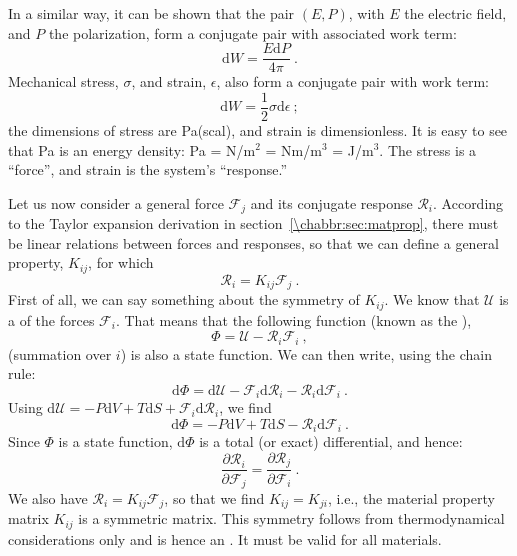 In a similar way, it can be shown that the pair $(E,P)$, with $E$ the electric field, and $P$ the polarization, form a  conjugate pair with associated work term:
\begin{equation}
	\mathrm{d}W = \frac{E\mathrm{d}P}{4\pi}\ .
\end{equation}
Mechanical stress, $\sigma$, and strain, $\epsilon$, also form a conjugate pair with work term:
\begin{equation}
	\mathrm{d}W = \frac{1}{2}\sigma\mathrm{d}\epsilon\ ;
\end{equation}
the dimensions of stress are Pa(scal), and strain is dimensionless.  It is easy to see that Pa is an energy density: Pa = N/m$^2$ = Nm/m$^3$ = J/m$^3$.  The stress is a ``force'', and strain is the system's ``response.''

Let us now consider a general force $\mathcal{F}_j$ and its conjugate response $\mathcal{R}_i$.  According to the Taylor expansion derivation in section~\ref{\chabbr:sec:matprop}, there must be linear relations between forces and responses, so that we can define a general property, $K_{ij}$, for which
\begin{equation}
	\mathcal{R}_i = K_{ij}\mathcal{F}_j\ .
\end{equation}
First of all, we can say something about the symmetry of $K_{ij}$.  We know that $\mathcal{U}$ is a  of the forces $\mathcal{F}_i$.  That means that the following function (known as the ), 
\begin{equation}
	\Phi = \mathcal{U} - \mathcal{R}_i\mathcal{F}_i\ ,
\end{equation}
(summation over $i$) is also a state function.  We can then write, using the chain rule:
\begin{equation}
	\mathrm{d}\Phi = \mathrm{d}\mathcal{U}-\mathcal{F}_i\mathrm{d}\mathcal{R}_i-\mathcal{R}_i\mathrm{d}\mathcal{F}_i\ .
\end{equation}
Using $\mathrm{d}\mathcal{U} = -P\mathrm{d}V+T\mathrm{d}S+\mathcal{F}_i\mathrm{d}\mathcal{R}_i$, we find
\begin{equation}
	\mathrm{d}\Phi = -P\mathrm{d}V+T\mathrm{d}S-\mathcal{R}_i\mathrm{d}\mathcal{F}_i\ .
\end{equation}
Since $\Phi$ is a state function, $\mathrm{d}\Phi$ is a total (or exact) differential, and hence:
\begin{equation}
	\frac{\partial \mathcal{R}_i}{\partial\mathcal{F}_j} = \frac{\partial \mathcal{R}_j}{\partial\mathcal{F}_i}\ .
\end{equation}
We also have $\mathcal{R}_i = K_{ij}\mathcal{F}_j$, so that we find $K_{ij} = K_{ji}$, i.e., the material property matrix $K_{ij}$ is a symmetric matrix.  This symmetry follows from thermodynamical considerations only and is hence an .  It must be valid for all materials.

